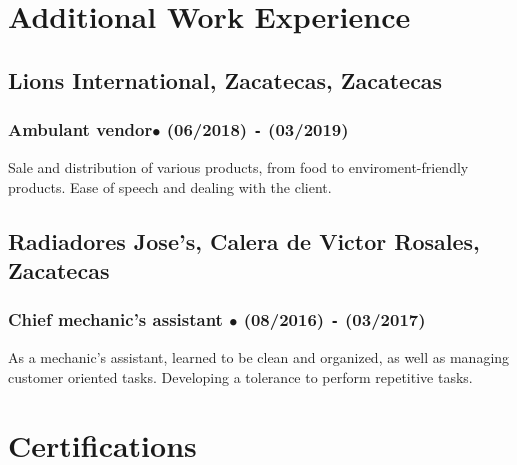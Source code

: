 \documentclass{article}
\begin{document}
  \section{Additional Work Experience}%

  \subsection{\textbf{Lions International}, Zacatecas, Zacatecas}

  \subsubsection{Ambulant vendor$\bullet$ (06/2018) \texttt{-} (03/2019)}

  Sale and distribution of various products, from food to enviroment-friendly products. Ease of speech and dealing with the client.

  \subsection{\textbf{Radiadores Jose's}, Calera de Victor Rosales, Zacatecas}

  \subsubsection{Chief mechanic's assistant $\bullet$ (08/2016) \texttt{-} (03/2017)}

  As a mechanic's assistant, learned to be clean and organized, as well as managing customer oriented tasks. Developing a tolerance to perform repetitive tasks.%


  \section{Certifications}%
\end{document}
